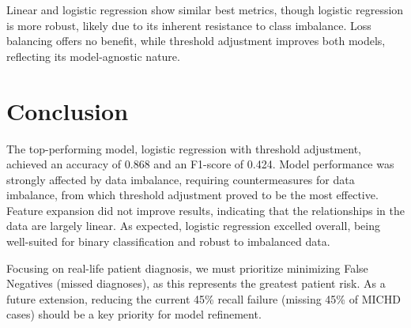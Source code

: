 \documentclass[10pt,conference,compsocconf]{IEEEtran}
\begin{document}

Linear and logistic regression show similar best metrics, though logistic regression is more robust, likely due to its inherent resistance to class imbalance. Loss balancing offers no benefit, while threshold adjustment improves both models, reflecting its model-agnostic nature.
\vspace{-0.5em}

\section{Conclusion}
The top-performing model, logistic regression with threshold adjustment, achieved an accuracy of 0.868 and an F1-score of 0.424. Model performance was strongly affected by data imbalance, requiring countermeasures for data imbalance, from which threshold adjustment proved to be the most effective. Feature expansion did not improve results, indicating that the relationships in the data are largely linear. As expected, logistic regression excelled overall, being well-suited for binary classification and robust to imbalanced data.

Focusing on real-life patient diagnosis, we must prioritize minimizing False Negatives (missed diagnoses), as this represents the greatest patient risk. As a future extension, reducing the current 45\% recall failure (missing 45\% of MICHD cases) should be a key priority for model refinement.




\end{document}
